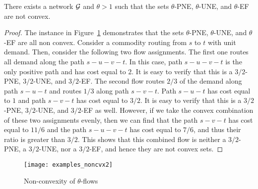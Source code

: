\begin{proposition} There exists a network $\mathcal{G}$ and $\theta>1$ such that the sets $\theta$-PNE, $\theta$-UNE, and $\theta$-EF are not convex.
\end{proposition}
\begin{proof}
The instance in Figure~\ref{fig:ex_noncvx2} demonstrates that the sets $\theta$-PNE, $\theta$-UNE, and $\theta$-EF are all non convex.  Consider a commodity routing from $s$ to $t$ with unit demand. 
Then, consider the following two flow assignments.
The first one routes all demand along the path $s-u-v-t$.  In this case, path $s-u-v-t$ is the only positive path and has cost equal to $2$.  It is easy to verify that this is a $3/2$-PNE, $3/2$-UNE, and $3/2$-EF.  The second flow routes $2/3$ of the demand along  path $s-u-t$ and routes $1/3$ along path $s-v-t$.  Path $s-u-t$ has cost equal to $1$ and path $s-v-t$ has cost equal to $3/2$.  It is easy to verify that this is a $3/2$-PNE, $3/2$-UNE, and $3/2$-EF as well.  However, if we take the convex combination of these two assignments evenly, then we can find that the path $s-v-t$ has cost equal to $11/6$ and the path $s-u-v-t$ has cost equal to $7/6$, and thus their ratio is greater than $3/2$.  This shows that this combined flow is neither a $3/2$-PNE, a $3/2$-UNE, nor a $3/2$-EF, and hence they are not convex sets.
\end{proof}

\begin{figure}
	\centering
	\texttt{[image: examples\_noncvx2]}
	\caption{Non-convexity of $\theta$-flows}
	\label{fig:ex_noncvx2}
\end{figure}


